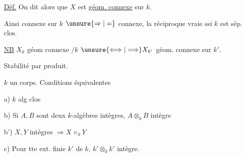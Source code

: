 \uline{Déf.} On dit alors que $X$ est \uline{géom. connexe} sur $k$.

Ainsi   connexe sur $k$ $\unsure{\Rightarrow|=}$ connexe, la réciproque vraie ssi $k$ est sép. clos.

\uline{NB} $X_k$ géom connexe $/k$ $\unsure{\Longleftrightarrow|\Longrightarrow} X_{k'}$ géom. connexe sur $k'$.

Stabilité par produit.


$k$ un corps. Conditions équivalentes


a) $k$ alg clos

b) Si $A,B$ sont deux $k$-algèbres intègres, $A\otimes_k B$ intègre

b')  $X,Y$ intègres $\Rightarrow X\times_k Y$ 

c) Pour tte ext. finie $k'$ de $k$, $k'\otimes_k k'$ intègre.

